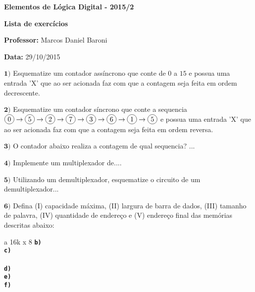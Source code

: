 \documentclass[12pt]{article}
\newcommand{\exerc}[3]{ \vspace*{25pt} {$\mathbf{#1)}$} #2 \hfill {\it #3} }
\newcommand{\exitem}[2]{ \texttt{\bf #1)} #2 \\ }
\newenvironment{exitems}[1]{
\\
\hspace*{30pt}
\begin{minipage}{0.8\textwidth}
\begin{multicols}{#1} 
}{
\end{multicols}
\end{minipage}
}
\newcommand*\circled[1]{\tikz[baseline=(char.base)]{
            \node[shape=circle,draw,inner sep=2pt] (char) {#1};}}
\begin{document}

\begin{center}
{\Large \bf Elementos de Lógica Digital - 2015/2}
\end{center}

{\large \bf Lista de exercícios}

{\bf Professor:} Marcos Daniel Baroni

{\bf Data:} 29/10/2015


\exerc{1}{Esquematize um contador assíncrono que conte de $0$ a $15$ e possua uma entrada 'X'
	que ao ser acionada faz com que a contagem seja feita em ordem decrescente.}{}

\exerc{2}{Esquematize um contador síncrono que conte a sequencia
	$\circled{0} \rightarrow
	\circled{5} \rightarrow
	\circled{2} \rightarrow
	\circled{7} \rightarrow
	\circled{3} \rightarrow
	\circled{6} \rightarrow
	\circled{1} \rightarrow \circled{5}$ e possua uma entrada 'X' que ao ser acionada faz com que a contagem
 	seja feita em ordem reversa.}{}

\exerc{3}{O contador abaixo realiza a contagem de qual sequencia?}{}
...

\exerc{4}{Implemente um multiplexador de....}{}

\exerc{5}{Utilizando um demultiplexador, esquematize o circuito de um demultiplexador...}{}

\exerc{6}{Defina (I) capacidade máxima, (II) largura de barra de dados, (III) tamanho de palavra,
(IV) quantidade de endereço e (V) endereço final das memórias descritas abaixo:}{}
\begin{exitems}{2}
	\exitem{a}{ 16k x 8}
	\exitem{b}{ }
	\exitem{c}{ }
	\\
	\exitem{d}{ }
	\exitem{e}{ }
	\exitem{f}{ }
\end{exitems}

\begin{multicols}{2}
\begin{center}
\end{center}
\end{multicols}
\end{document}
